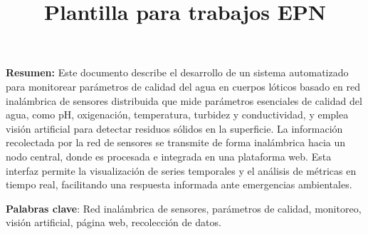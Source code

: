 \documentclass[12pt,a4paper]{book}
\title{Plantilla para trabajos EPN}
\renewcommand{\cleardoublepage}{\clearpage}
\begin{document}
\maketitlepage %
\newpage
\textbf{Resumen:}
Este documento describe el desarrollo de un sistema automatizado para monitorear parámetros de calidad del agua en cuerpos lóticos basado en red inalámbrica de sensores distribuida que mide parámetros esenciales de calidad del agua, como pH, oxigenación, temperatura, turbidez y conductividad, y emplea visión artificial para detectar residuos sólidos en la superficie. La información recolectada por la red de sensores se transmite de forma inalámbrica hacia un nodo central, donde es procesada e integrada en una plataforma web. Esta interfaz permite la visualización de series temporales y el análisis de métricas en tiempo real, facilitando una respuesta informada ante emergencias ambientales.

\textbf{Palabras clave}: Red inalámbrica de sensores, parámetros de calidad, monitoreo, visión artificial, página web, recolección de datos.
\newpage


\tableofcontents %
\listoffigures   %
\listoftables    %












%
%

\cleardoublepage
{}
{}
\printbibliography[title={Referencias}] %
\end{document}

